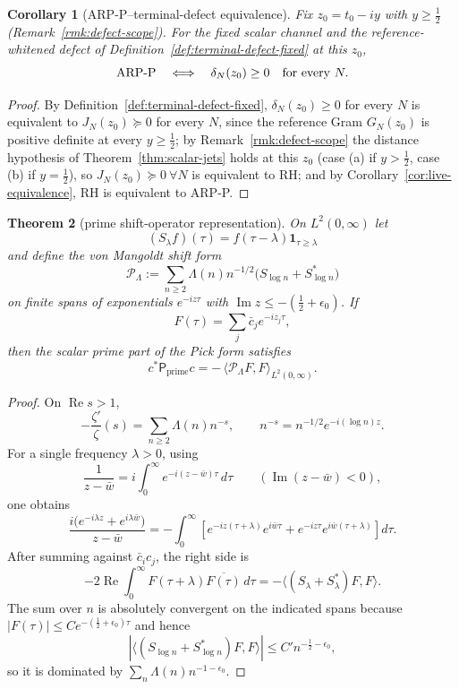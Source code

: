 \documentclass[11pt]{amsart}
\newtheorem{theorem}{Theorem}[section]
\newtheorem{corollary}[theorem]{Corollary}
\theoremstyle{definition}
\theoremstyle{remark}
\theoremstyle{definition}
\renewcommand{\Re}{\operatorname{Re}}
\renewcommand{\Im}{\operatorname{Im}}
\newcommand{\half}{\tfrac{1}{2}}
\begin{document}
\begin{corollary}[ARP-P--terminal-defect equivalence]\label{cor:arp-terminal-defect}
Fix $z_0=t_0-iy$ with $y\ge\half$ (Remark~\ref{rmk:defect-scope}).  For the fixed scalar channel and the
reference-whitened defect of Definition~\ref{def:terminal-defect-fixed} at this $z_0$,
\[
   \textnormal{ARP-P}
   \quad\Longleftrightarrow\quad
   \delta_N(z_0)\ge0\quad\text{for every }N.
\]
\end{corollary}

\begin{proof}
By Definition~\ref{def:terminal-defect-fixed}, $\delta_N(z_0)\ge0$ for every $N$ is equivalent to
$J_N(z_0)\succeq0$ for every $N$, since the reference Gram $G_N(z_0)$ is positive definite at every
$y\ge\half$; by Remark~\ref{rmk:defect-scope} the distance hypothesis of
Theorem~\ref{thm:scalar-jets} holds at this $z_0$ (case (a) if $y>\half$, case (b) if $y=\half$), so
$J_N(z_0)\succeq0\ \forall N$ is equivalent to RH; and by
Corollary~\ref{cor:live-equivalence}, RH is equivalent to ARP-P.
\end{proof}

\begin{theorem}[prime shift-operator representation]\label{thm:prime-shift}
On $L^2(0,\infty)$ let
\[
   (S_\lambda f)(\tau)=f(\tau-\lambda)\mathbf 1_{\tau\ge\lambda}
\]
and define the von Mangoldt shift form
\[
   \mathcal P_\Lambda
   :=
   \sum_{n\ge2}\Lambda(n)n^{-1/2}\bigl(S_{\log n}+S_{\log n}^*\bigr)
\]
on finite spans of exponentials $e^{-iz\tau}$ with $\Im z\le-(\half+\epsilon_0)$.  If
\[
   F(\tau)=\sum_j\bar c_j e^{-iz_j\tau},
\]
then the scalar prime part of the Pick form satisfies
\[
   c^*\mathsf P_{\mathrm{prime}}c
   =
   -\,\langle \mathcal P_\Lambda F,F\rangle_{L^2(0,\infty)}.
\]
\end{theorem}

\begin{proof}
On $\Re s>1$,
\[
   -\frac{\zeta'}{\zeta}(s)=\sum_{n\ge2}\Lambda(n)n^{-s},
   \qquad
   n^{-s}=n^{-1/2}e^{-i(\log n)z}.
\]
For a single frequency $\lambda>0$, using
\[
   \frac1{z-\bar w}=i\int_0^\infty e^{-i(z-\bar w)\tau}\,d\tau
   \qquad(\Im(z-\bar w)<0),
\]
one obtains
\[
   \frac{i\bigl(e^{-i\lambda z}+e^{i\lambda\bar w}\bigr)}{z-\bar w}
   =
   -\int_0^\infty
      \left[
        e^{-iz(\tau+\lambda)}e^{i\bar w\tau}
        +
        e^{-iz\tau}e^{i\bar w(\tau+\lambda)}
      \right]d\tau .
\]
After summing against $\bar c_ic_j$, the right side is
\[
   -2\Re\int_0^\infty F(\tau+\lambda)\overline{F(\tau)}\,d\tau
   =
   -\langle(S_\lambda+S_\lambda^*)F,F\rangle .
\]
The sum over $n$ is absolutely convergent on the indicated spans because
$|F(\tau)|\le Ce^{-(\half+\epsilon_0)\tau}$ and hence
\[
   |\langle(S_{\log n}+S_{\log n}^*)F,F\rangle|
   \le C'n^{-\half-\epsilon_0},
\]
so it is dominated by $\sum_n\Lambda(n)n^{-1-\epsilon_0}$.
\end{proof}
\end{document}
